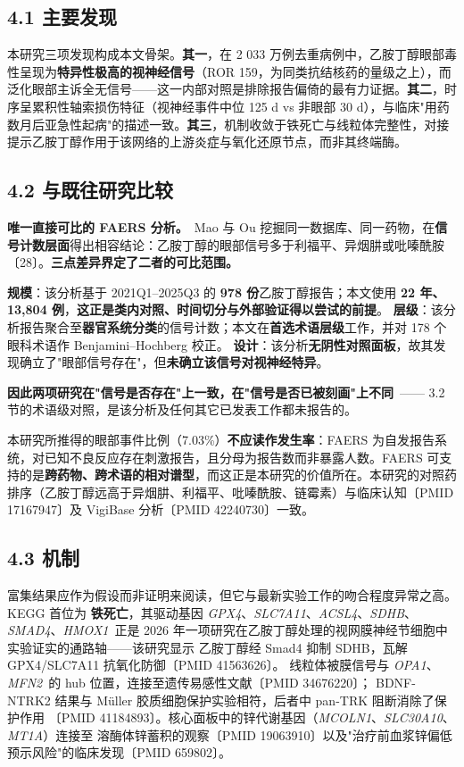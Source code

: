 \documentclass[UTF8,fontset=windows,11pt]{ctexart}
\begin{document}
\subsection{4.1 主要发现}

本研究三项发现构成本文骨架。\textbf{其一}，在 2 033 万例去重病例中，乙胺丁醇眼部毒性呈现为\textbf{特异性极高的视神经信号}（ROR 159，为同类抗结核药的量级之上），而泛化眼部主诉全无信号——这一内部对照是排除报告偏倚的最有力证据。\textbf{其二}，时序呈累积性轴索损伤特征（视神经事件中位 125 d vs 非眼部 30 d），与临床"用药数月后亚急性起病"的描述一致。\textbf{其三}，机制收敛于铁死亡与线粒体完整性，对接提示乙胺丁醇作用于该网络的上游炎症与氧化还原节点，而非其终端酶。

\subsection{4.2 与既往研究比较}

\textbf{唯一直接可比的 FAERS 分析。}\ Mao 与 Ou 挖掘同一数据库、同一药物，在\textbf{信号计数层面}得出相容结论：乙胺丁醇的眼部信号多于利福平、异烟肼或吡嗪酰胺〔28〕。\textbf{三点差异界定了二者的可比范围。}

\textbf{规模}：该分析基于 2021Q1–2025Q3 的 \textbf{978 份}乙胺丁醇报告；本文使用 \textbf{22 年、13,804 例}，\textbf{这正是类内对照、时间切分与外部验证得以尝试的前提}。 \textbf{层级}：该分析报告聚合至\textbf{器官系统分类}的信号计数；本文在\textbf{首选术语层级}工作，并对 178 个眼科术语作 Benjamini–Hochberg 校正。 \textbf{设计}：该分析\textbf{无阴性对照面板}，故其发现确立了"眼部信号存在"，但\textbf{未确立该信号对视神经特异}。

\textbf{因此两项研究在"信号是否存在"上一致，在"信号是否已被刻画"上不同}\ —— 3.2 节的术语级对照，是该分析及任何其它已发表工作都未报告的。

本研究所推得的眼部事件比例（7.03\%）\textbf{不应读作发生率}：FAERS 为自发报告系统，对已知不良反应存在刺激报告，且分母为报告数而非暴露人数。FAERS 可支持的是\textbf{跨药物、跨术语的相对谱型}，而这正是本研究的价值所在。本研究的对照药排序（乙胺丁醇远高于异烟肼、利福平、吡嗪酰胺、链霉素）与临床认知〔PMID 17167947〕及 VigiBase 分析〔PMID 42240730〕一致。

\subsection{4.3 机制}

富集结果应作为假设而非证明来阅读，但它与最新实验工作的吻合程度异常之高。KEGG 首位为 \textbf{铁死亡}，其驱动基因 \textit{GPX4}、\textit{SLC7A11}、\textit{ACSL4}、\textit{SDHB}、\textit{SMAD4}、\textit{HMOX1}\ 正是 2026 年一项研究在乙胺丁醇处理的视网膜神经节细胞中实验证实的通路轴——该研究显示 乙胺丁醇经 Smad4 抑制 SDHB，瓦解 GPX4/SLC7A11 抗氧化防御〔PMID 41563626〕。 线粒体被膜信号与 \textit{OPA1}、\textit{MFN2}\ 的 hub 位置，连接至遗传易感性文献〔PMID 34676220〕； BDNF-NTRK2 结果与 Müller 胶质细胞保护实验相符，后者中 pan-TRK 阻断消除了保护作用 〔PMID 41184893〕。核心面板中的锌代谢基因（\textit{MCOLN1}、\textit{SLC30A10}、\textit{MT1A}）连接至 溶酶体锌蓄积的观察〔PMID 19063910〕以及"治疗前血浆锌偏低预示风险"的临床发现〔PMID 659802〕。
\end{document}
